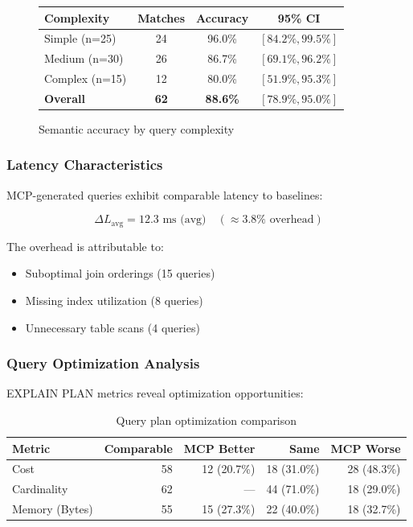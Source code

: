 \documentclass[11pt,a4paper]{article}
\begin{document}
\begin{figure}[h]
\centering
\begin{tabular}{lccc}
\toprule
\textbf{Complexity} & \textbf{Matches} & \textbf{Accuracy} & \textbf{95\% CI} \\
\midrule
Simple (n=25) & 24 & 96.0\% & $[84.2\%, 99.5\%]$ \\
Medium (n=30) & 26 & 86.7\% & $[69.1\%, 96.2\%]$ \\
Complex (n=15) & 12 & 80.0\% & $[51.9\%, 95.3\%]$ \\
\midrule
\textbf{Overall} & \textbf{62} & \textbf{88.6\%} & $[78.9\%, 95.0\%]$ \\
\bottomrule
\end{tabular}
\caption{Semantic accuracy by query complexity}
\label{tab:accuracy_by_complexity}
\end{figure}

\subsubsection{Latency Characteristics}

MCP-generated queries exhibit comparable latency to baselines:

\begin{equation}
\Delta L_{\text{avg}} = 12.3 \text{ ms (avg)} \quad (\approx 3.8\% \text{ overhead})
\end{equation}

The overhead is attributable to:
\begin{itemize}
    \item Suboptimal join orderings (15 queries)
    \item Missing index utilization (8 queries)
    \item Unnecessary table scans (4 queries)
\end{itemize}

\subsubsection{Query Optimization Analysis}

EXPLAIN PLAN metrics reveal optimization opportunities:

\begin{table}[h]
\centering
\begin{tabular}{lrrrr}
\toprule
\textbf{Metric} & \textbf{Comparable} & \textbf{MCP Better} & \textbf{Same} & \textbf{MCP Worse} \\
\midrule
Cost & 58 & 12 (20.7\%) & 18 (31.0\%) & 28 (48.3\%) \\
Cardinality & 62 & — & 44 (71.0\%) & 18 (29.0\%) \\
Memory (Bytes) & 55 & 15 (27.3\%) & 22 (40.0\%) & 18 (32.7\%) \\
\bottomrule
\end{tabular}
\caption{Query plan optimization comparison}
\label{tab:optimization}
\end{table}
\end{document}
